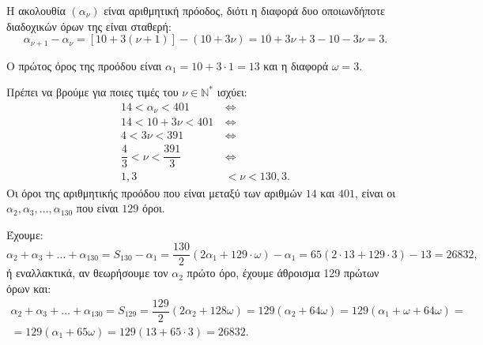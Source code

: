 
\begin{alist}
\item Η ακολουθία $(\alpha_\nu)$ είναι αριθμητική πρόοδος, διότι η διαφορά δυο οποιωνδήποτε
διαδοχικών όρων της είναι σταθερή:
\[\alpha_{\nu+1} - \alpha_\nu = [10 + 3(\nu + 1)] - (10 + 3\nu) = 10 + 3\nu + 3 - 10 - 3\nu = 3.\]

Ο πρώτος όρος της προόδου είναι $\alpha_1 = 10 + 3 \cdot 1 = 13$ και η διαφορά $\omega = 3$.

\item Πρέπει να βρούμε για ποιες τιμές του $\nu \in \mathbb{N}^*$ ισχύει:
\begin{align*}
14 < \alpha_\nu < 401 \ &\Leftrightarrow \\
14 < 10 + 3\nu < 401 \ &\Leftrightarrow \\
4 < 3\nu < 391 \ &\Leftrightarrow \\
\dfrac{4}{3} < \nu < \dfrac{391}{3} \ &\Leftrightarrow \\
1,3 &< \nu < 130,3.
\end{align*}
Οι όροι της αριθμητικής προόδου που είναι μεταξύ των αριθμών $14$ και $401$, είναι οι
$\alpha_2, \alpha_3, \dots, \alpha_{130}$ που είναι $129$ όροι.

\item Έχουμε:
\[\alpha_2 + \alpha_3 + \dots + \alpha_{130} = S_{130} - \alpha_1 = \dfrac{130}{2}(2\alpha_1 + 129 \cdot \omega) - \alpha_1 = 65(2 \cdot 13 + 129 \cdot 3) - 13 = 26832,\]
ή εναλλακτικά, αν θεωρήσουμε τον $\alpha_2$ πρώτο όρο, έχουμε άθροισμα 129 πρώτων όρων και:
\begin{gather*}
\alpha_2 + \alpha_3 + \dots + \alpha_{130} = S_{129} = \dfrac{129}{2}(2\alpha_2 + 128\omega) = 129(\alpha_2 + 64\omega) = 129(\alpha_1 + \omega + 64\omega) = \\
= 129(\alpha_1 + 65\omega) = 129(13 + 65 \cdot 3) = 26832.
\end{gather*}
\end{alist}

